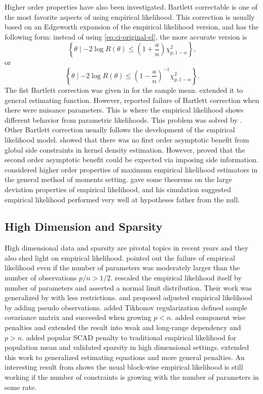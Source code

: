 Higher order properties have also been investigated. Bartlett
correctable is one of the most favorite aspects of using empirical likelihood.
This correction is usually based on an Edgeworth expansion of the empirical
likelihood version, and has the following form: instead of using \ref{eq:ci-original-el},
the more accurate version is 
\[
\left\{ \theta\mid-2\log R\left(\theta\right)\le\left(1+\frac{a}{n}\right)\chi_{p,1-\alpha}^{2}\right\} ,
\]
or 
\[
\left\{ \theta\mid-2\log R\left(\theta\right)\le\left(1-\frac{a}{n}\right)^{-1}\chi_{p,1-\alpha}^{2}\right\} .
\]
The fist Bartlett correction was given in \citet{diciccio1991empirical}
for the sample mean. \citet{zhang1996accuracy} extended it to general
estimating function. However, \citet{lazar1999empirical} reported
failure of Bartlett correction when there were nuisance parameters.
This is where the empirical likelihood shows different
behavior from parametric likelihoods. This problem was solved by \citet{chen2006bartlett}.
Other Bartlett correction usually follows the development of the empirical
likelihood model. \citet{biao1998note} showed that there was no first
order asymptotic benefit from global side constraints in kernel density
estimation. However, \citet{chen1997empirical} proved that the second
order asymptotic benefit could be expected via imposing side information.
\citet{newey2004higher} considered higher order properties of
maximum empirical likelihood estimators in the general method of moments
setting. \citet{kitamura2001asymptotic} gave some theorems on the
large deviation properties of empirical likelihood, and his simulation
suggested empirical likelihood performed very well at hypotheses father
from the null. 


\subsection{High Dimension and Sparsity}

High dimensional data and sparsity are pivotal topics in recent years
and they also shed light on empirical likelihood. \citet{tsao2004bounds}
pointed out the failure of empirical likelihood even if the number
of parameters was moderately larger than the number of observations $p/n>1/2$.
\citet{hjort2009extending} rescaled the empirical likelihood itself
by number of parameters and asserted a normal limit distribution. Their
work was generalized by \citet{chen2009effects} with less restrictions.
\citet{chen2008adjusted} and \citet{emerson2009calibration} proposed adjusted
empirical likelihood by adding pseudo observations. \citet{bartolucci2007penalized}
added Tikhonov regularization defined sample covariance matrix and
succeeded when growing $p<n$. \citet{lahiri2012penalized} added
component wise penalties and extended the result into weak and  long-range
dependency and $p>n$. \citet{tang2010penalized} added popular SCAD
penalty to traditional empirical likelihood for population mean and
validated sparsity in high dimensional settings. \citet{leng2012penalized}
extended this work to generalized estimating equations and more general
penalties. An interesting result from \citet{chang2015high} shows
the usual block-wise empirical likelihood is still working if the
number of constraints is growing with the number of parameters in some
rate.


